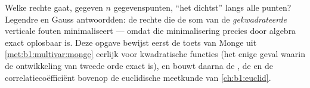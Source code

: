 \begin{problem}\label{pb:b1:multivar:1}
Welke rechte gaat, gegeven $n$ gegevenspunten, ``het dichtst''
langs alle punten? Legendre en Gauss antwoordden: de rechte die de
som van de \emph{gekwadrateerde} verticale fouten minimaliseert ---
omdat die minimalisering precies door  algebra exact
oplosbaar is. Deze opgave bewijst eerst de toets van Monge uit
\cref{met:b1:multivar:monge} eerlijk voor kwadratische functies
(het enige geval waarin de ontwikkeling van tweede orde exact is),
en bouwt daarna de , de  en de
correlatiecoëfficiënt bovenop de euclidische meetkunde van
\cref{ch:b1:euclid}.


\end{problem}
